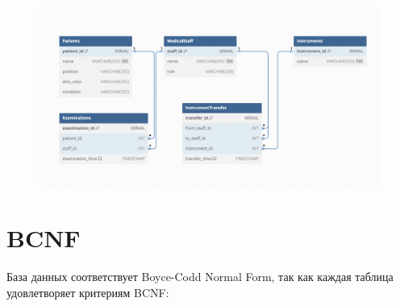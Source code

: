 \documentclass[14pt]{extreport}
\begin{document}
            \begin{landscape}
                \begin{figure}[h]
                    \centering
                    \includegraphics[width=21cm]{ddl.png}
                \end{figure}
                \end{landscape}


    \section{BCNF}
            База данных соответствует Boyce-Codd Normal Form, так как каждая таблица удовлетворяет критериям BCNF:
\end{document}
